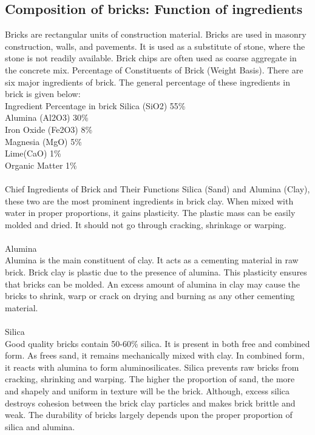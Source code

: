 
\newpage
\subsection{Composition of bricks: Function of ingredients}
Bricks are rectangular units of construction material. Bricks are used in masonry construction, walls, and pavements. It is used as a substitute of stone, where the stone is not readily available. Brick chips are often used as coarse aggregate in the concrete mix.
Percentage of Constituents of Brick (Weight Basis).
There are six major ingredients of brick. The general percentage of these ingredients in brick is given below:\\
Ingredient	Percentage in brick
Silica (SiO2)	55\%\\
Alumina (Al2O3)	30\%\\
Iron Oxide (Fe2O3)	8\%\\
Magnesia (MgO)	5\%\\
Lime(CaO)	1\%\\
Organic Matter	1\%\\
\vspace{0.1cm}\\
Chief Ingredients of Brick and Their Functions
Silica (Sand) and Alumina (Clay), these two are the most prominent ingredients in brick clay. When mixed with water in proper proportions, it gains plasticity. The plastic mass can be easily molded and dried. It should not go through cracking, shrinkage or warping.\\
\vspace{0.1cm}\\
Alumina\\
Alumina is the main constituent of clay. It acts as a cementing material in raw brick. Brick clay is plastic due to the presence of alumina. This plasticity ensures that bricks can be molded. An excess amount of alumina in clay may cause the bricks to shrink, warp or crack on drying and burning as any other cementing material.\\
\vspace{0.1cm}\\
Silica\\
Good quality bricks contain 50-60\% silica. It is present in both free and combined form. As frees sand, it remains mechanically mixed with clay. In combined form, it reacts with alumina to form aluminosilicates. Silica prevents raw bricks from cracking, shrinking and warping. The higher the proportion of sand, the more and shapely and uniform in texture will be the brick. Although, excess silica destroys cohesion between the brick clay particles and makes brick brittle and weak. The durability of bricks largely depends upon the proper proportion of silica and alumina.\\
